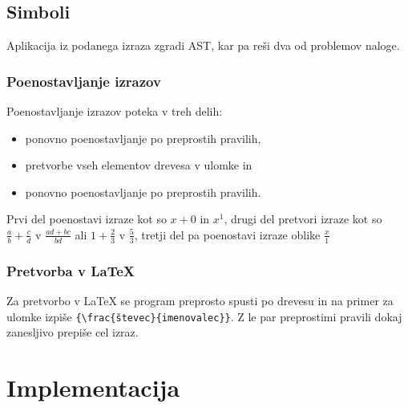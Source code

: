 \documentclass[12pt]{report}
\begin{document}
	\section{Simboli}
	\label{symbol}
		Aplikacija iz podanega izraza zgradi AST, kar pa reši dva od problemov naloge.
			\subsection{Poenostavljanje izrazov}
				Poenostavljanje izrazov poteka v treh delih:
				\begin{itemize}
					\item ponovno poenostavljanje po preprostih pravilih,
					\item pretvorbe vseh elementov drevesa v ulomke in
					\item ponovno poenostavljanje po preprostih pravilih.
				\end{itemize}
				Prvi del poenostavi izraze kot so $ x + 0 $ in $ x^1 $, drugi del pretvori izraze kot so $ \frac{a}{b} + \frac{c}{d} $ v $ \frac{ad + bc}{bd} $ ali $ 1 + \frac{2}{3} $ v $ \frac{5}{3} $, tretji del pa poenostavi izraze oblike $ \frac{x}{1} $
			\subsection{Pretvorba v \LaTeX{}}
				Za pretvorbo v \LaTeX{} se program preprosto spusti po drevesu in na primer za ulomke izpiše \texttt{\{\textbackslash frac\{števec\}\{imenovalec\}\}}. Z le par preprostimi pravili dokaj zanesljivo prepiše cel izraz.
\clearpage			
\chapter{Implementacija}
\label{impl}
\end{document}
